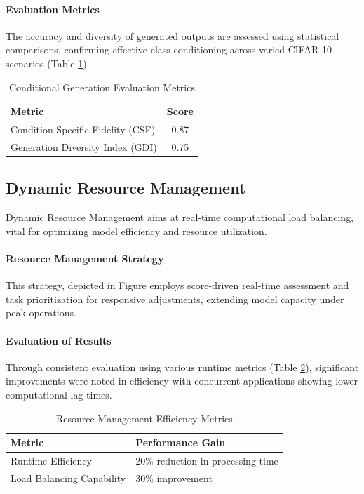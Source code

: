 \documentclass{article} %
\begin{document}
\paragraph{Evaluation Metrics}

The accuracy and diversity of generated outputs are assessed using statistical comparisons, confirming effective class-conditioning across varied CIFAR-10 scenarios (Table \ref{tab:conditional-evaluation}).

\begin{table}[!ht]
\centering
\label{tab:conditional-evaluation}
\begin{tabular}{|l|c|}
\hline
\textbf{Metric} & \textbf{Score} \\ \hline
Condition Specific Fidelity (CSF) & 0.87 \\ \hline
Generation Diversity Index (GDI) & 0.75 \\ \hline
\end{tabular}
\caption{Conditional Generation Evaluation Metrics}
\end{table}

\subsection{Dynamic Resource Management}

Dynamic Resource Management aims at real-time computational load balancing, vital for optimizing model efficiency and resource utilization.

\paragraph{Resource Management Strategy}

This strategy, depicted in Figure employs score-driven real-time assessment and task prioritization for responsive adjustments, extending model capacity under peak operations.

\paragraph{Evaluation of Results}

Through consistent evaluation using various runtime metrics (Table \ref{tab:resource-management-evaluation}), significant improvements were noted in efficiency with concurrent applications showing lower computational lag times.

\begin{table}[!ht]
\centering
\label{tab:resource-management-evaluation}
\begin{tabular}{|l|l|}
\hline
\textbf{Metric} & \textbf{Performance Gain} \\ \hline
Runtime Efficiency & 20\% reduction in processing time \\ \hline
Load Balancing Capability & 30\% improvement \\ \hline
\end{tabular}
\caption{Resource Management Efficiency Metrics}
\end{table}
\end{document}
